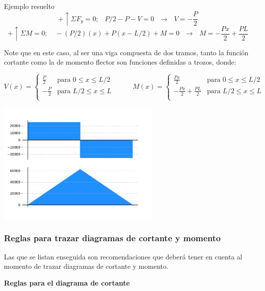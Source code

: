 \documentclass[12pt,letterpaper]{article}
\begin{document}
\begin{ejemplo}{Ejemplo resuelto}
$$ +\uparrow \Sigma F_y = 0; \,\,\,\,\, P/2 - P - V = 0  \,\,\,\, \rightarrow \,\,\,\, V = -\frac{P}{2} $$
$$ +\uparrow \Sigma M = 0; \,\,\,\,\,\, -(P/2)(x) + P(x-L/2) + M = 0  \,\,\,\, \rightarrow \,\,\,\, M = -\frac{Px}{2} + \frac{PL}{2} $$

Note que en este caso, al ser una viga compuesta de dos tramos, tanto la función cortante como la de 
momento flector son funciones definidas a trozos, donde:

$$ 
V(x) = \left\{ 
\begin{matrix}
\frac{P}{2} & \text{para  } 0 \leq x \leq L/2 \\
-\frac{P}{2} & \text{para  } L/2 \leq x \leq L \\
\end{matrix}
\right. 
\,\,\,\,\,\,\,\,\,\,\,\,\,\,\,\,
M(x) = \left\{ 
\begin{matrix}
\frac{Px}{2} & \text{para  } 0 \leq x \leq L/2 \\
-\frac{Px}{2} + \frac{PL}{2} & \text{para  } L/2 \leq x \leq L \\ 
\end{matrix}
\right. 
$$


\begin{center}
\includegraphics[width=0.6\textwidth]{code/shear_moment_02.pdf}
\end{center}

\end{ejemplo}

\subsubsection{Reglas para trazar diagramas de cortante y momento}

Las que se listan enseguida son recomendaciones que deberá tener en cuenta al 
momento de trazar diagramas de cortante y momento.


\textbf{Reglas para el diagrama de cortante}
\end{document}
